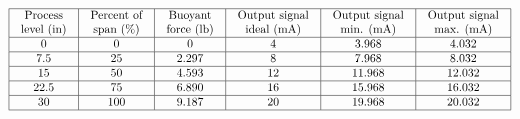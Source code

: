 






$$\vbox{\offinterlineskip
\halign{\strut
\vrule \quad\hfil # \ \hfil & 
\vrule \quad\hfil # \ \hfil & 
\vrule \quad\hfil # \ \hfil & 
\vrule \quad\hfil # \ \hfil & 
\vrule \quad\hfil # \ \hfil & 
\vrule \quad\hfil # \ \hfil \vrule \cr
\noalign{\hrule}
%
Process & Percent of & Buoyant & Output signal & Output signal & Output signal \cr
%
level (in) & span (\%) & force (lb) & ideal (mA) & min. (mA) & max. (mA) \cr
%
\noalign{\hrule}
%
0 & 0 & 0 & 4 & 3.968 & 4.032 \cr
%
\noalign{\hrule}
%
7.5 & 25 & 2.297 & 8 & 7.968 & 8.032 \cr
%
\noalign{\hrule}
%
15 & 50 & 4.593 & 12 & 11.968 & 12.032 \cr
%
\noalign{\hrule}
%
22.5 & 75 & 6.890 & 16 & 15.968 & 16.032 \cr
%
\noalign{\hrule}
%
30 & 100 & 9.187 & 20 & 19.968 & 20.032 \cr
%
\noalign{\hrule}
} %
}$$ %












